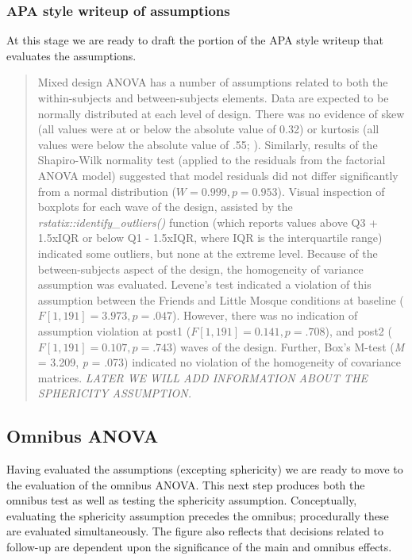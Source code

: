\documentclass[
  11pt,
]{book}
\begin{document}
\hypertarget{apa-style-writeup-of-assumptions}{%
\subsubsection{APA style writeup of assumptions}\label{apa-style-writeup-of-assumptions}}

At this stage we are ready to draft the portion of the APA style writeup that evaluates the assumptions.

\begin{quote}
Mixed design ANOVA has a number of assumptions related to both the within-subjects and between-subjects elements. Data are expected to be normally distributed at each level of design. There was no evidence of skew (all values were at or below the absolute value of 0.32) or kurtosis (all values were below the absolute value of .55; \citep{kline_data_2016}). Similarly, results of the Shapiro-Wilk normality test (applied to the residuals from the factorial ANOVA model) suggested that model residuals did not differ significantly from a normal distribution (\(W = 0.999, p = 0.953\)). Visual inspection of boxplots for each wave of the design, assisted by the \emph{rstatix::identify\_outliers()} function (which reports values above Q3 + 1.5xIQR or below Q1 - 1.5xIQR, where IQR is the interquartile range) indicated some outliers, but none at the extreme level. Because of the between-subjects aspect of the design, the homogeneity of variance assumption was evaluated. Levene's test indicated a violation of this assumption between the Friends and Little Mosque conditions at baseline (\(F[1, 191] = 3.973, p = .047\)). However, there was no indication of assumption violation at post1 (\(F[1, 191] = 0.141, p = .708\)), and post2 (\(F[1, 191] = 0.107, p = .743\)) waves of the design. Further, Box's M-test (\emph{M} = 3.209, \emph{p} = .073) indicated no violation of the homogeneity of covariance matrices. \emph{LATER WE WILL ADD INFORMATION ABOUT THE SPHERICITY ASSUMPTION.}
\end{quote}

\hypertarget{omnibus-anova}{%
\subsection{Omnibus ANOVA}\label{omnibus-anova}}

Having evaluated the assumptions (excepting sphericity) we are ready to move to the evaluation of the omnibus ANOVA. This next step produces both the omnibus test as well as testing the sphericity assumption. Conceptually, evaluating the sphericity assumption precedes the omnibus; procedurally these are evaluated simultaneously. The figure also reflects that decisions related to follow-up are dependent upon the significance of the main and omnibus effects.
\end{document}
